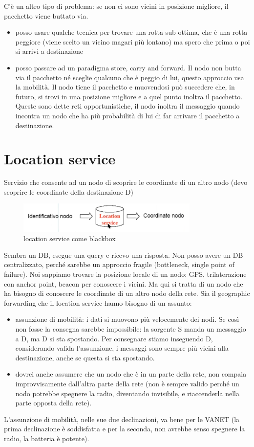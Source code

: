 \documentclass[12pt,italian]{report}
\begin{document}
\bigbreak
C'è un altro tipo di problema: se non ci sono vicini in posizione migliore, il pacchetto viene buttato via. 
\begin{itemize}
    \item posso usare qualche tecnica per trovare una rotta sub-ottima, che è una rotta peggiore (viene scelto un vicino magari più lontano) ma spero che prima o poi si arrivi a destinazione
    \item posso passare ad un paradigma store, carry and forward. Il nodo non butta via il pacchetto né sceglie qualcuno che è peggio di lui, questo approccio usa la mobilità. Il nodo tiene il pacchetto e muovendosi può succedere che, in futuro, si trovi in una posizione migliore e a quel punto inoltra il pacchetto. \\Queste sono dette reti opportunistiche, il nodo inoltra il messaggio quando incontra un nodo che ha più probabilità di lui di far arrivare il pacchetto a destinazione. 
\end{itemize}

\section{Location service}
Servizio che consente ad un nodo di scoprire le coordinate di un altro nodo (devo scoprire le coordinate della destinazione D)
\begin{figure}[h]
\centering
\includegraphics[width=90mm]{img/locserv.PNG}
\caption{location service come blackbox}
\label{fig:locser}
\end{figure}
\bigbreak
Sembra un DB, esegue una query e ricevo una risposta. Non posso avere un DB centralizzato, perché sarebbe un approccio fragile (bottleneck, single point of failure). 
\bigbreak
Noi sappiamo trovare la posizione locale di un nodo: GPS, trilaterazione con anchor point, beacon per conoscere i vicini. Ma qui si tratta di un nodo che ha bisogno di conoscere le coordinate di un altro nodo della rete. 
\bigbreak
\noindent Sia il geographic forwarding che il location service hanno bisogno di un assunto:
\begin{itemize}
    \item assunzione di mobilità: i dati si muovono più velocemente dei nodi. Se così non fosse la consegna sarebbe impossibile: la sorgente S manda un messaggio a D, ma D si sta spostando. Per consegnare stiamo inseguendo D, considerando valida l'assunzione, i messaggi sono sempre più vicini alla destinazione, anche se questa si sta spostando. 
    \item dovrei anche assumere che un nodo che è in un parte della rete, non compaia improvvisamente dall'altra parte della rete (non è sempre valido perché un nodo potrebbe spegnere la radio, diventando invisibile, e riaccenderla nella parte opposta della rete). 
\end{itemize}
L'assunzione di mobilità, nelle sue due declinazioni, va bene per le VANET (la prima declinazione è soddisfatta e per la seconda, non avrebbe senso spegnere la radio, la batteria è potente). 
\end{document}
